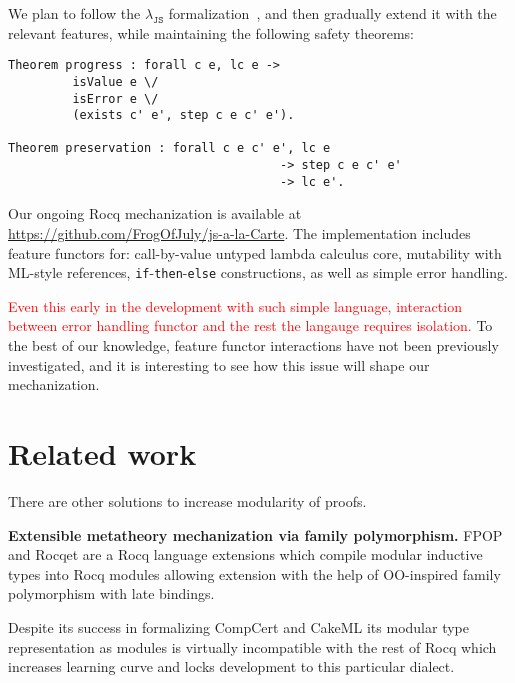 \documentclass[sigplan,nonacm]{acmart}
\begin{document}

We plan to follow the $\lambda_{\texttt{JS}}$ formalization~\cite{guha2010essence},
and then gradually extend it with the relevant features,
while maintaining the following safety theorems:

\begin{lstlisting}[numbers=none, language=Coq]
Theorem progress : forall c e, lc e -> 
         isValue e \/ 
         isError e \/ 
         (exists c' e', step c e c' e').

Theorem preservation : forall c e c' e', lc e
                                      -> step c e c' e'
                                      -> lc e'.
\end{lstlisting}

Our ongoing Rocq mechanization is available at
\url{https://github.com/FrogOfJuly/js-a-la-Carte}. 
The implementation includes feature functors for: call-by-value untyped lambda calculus core, mutability with ML-style references, \texttt{if}-\texttt{then}-\texttt{else} constructions, as well as simple error handling.


\textcolor{red}{Even this early in the development with such simple language, interaction between error handling functor and the rest the langauge requires isolation.} To the best of our knowledge, feature functor interactions have not been previously investigated, and it is interesting to see how this issue will shape our mechanization.



\section{Related work}

There are other solutions to increase modularity of proofs. 

\medskip

\textbf{Extensible metatheory mechanization via family polymorphism. } FPOP\cite{jin2023extensible} and Rocqet\cite{ebresafe2025certified} are a Rocq language extensions which compile modular inductive types into Rocq modules allowing extension with the help of 
OO-inspired family polymorphism with late bindings. 

Despite its success in formalizing CompCert and CakeML its modular type representation as modules is virtually incompatible with the rest of Rocq which increases learning curve and locks development to this particular dialect. 
\end{document}
